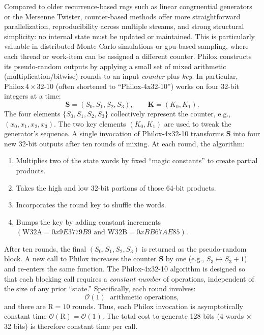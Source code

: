 Compared to older recurrence-based \acrshort{rng}s such as linear congruential generators or the Mersenne Twister, counter-based methods offer more straightforward parallelization, reproducibility across multiple streams, and strong structural simplicity: no internal state must be updated or maintained. This is particularly valuable in distributed Monte Carlo simulations or \acrshort{gpu}-based sampling, where each thread or work-item can be assigned a different counter. Philox constructs its pseudo-random outputs by applying a small set of mixed arithmetic (multiplication/bitwise) rounds to an input \emph{counter} plus \emph{key}. In particular, \(\mathrm{Philox}\,4\times32\text{-10}\) (often shortened to “Philox-4x32-10”) works on four 32-bit integers at a time:
\[
  \mathbf{S} = (S_0, S_1, S_2, S_3),
  \qquad
  \mathbf{K} = (K_0, K_1).
\]
The four elements \(\{S_0, S_1, S_2, S_3\}\) collectively represent the counter, e.g., \((x_0, x_1, x_2, x_3)\). The two key elements \((K_0, K_1)\) are used to tweak the generator's sequence. A single invocation of Philox-4x32-10 transforms \(\mathbf{S}\) into four new 32-bit outputs after ten rounds of mixing. At each round, the algorithm:
\begin{enumerate}
    \item Multiplies two of the state words by fixed “magic constants” to create partial products.
    \item Takes the high and low 32-bit portions of those 64-bit products.
    \item Incorporates the round key to shuffle the words.
    \item Bumps the key by adding constant increments \((\mathrm{W32A} = 0x9E3779B9 \text{ and } \mathrm{W32B} = 0xBB67AE85)\).
\end{enumerate}
After ten rounds, the final \((S_0, S_1, S_2, S_3)\) is returned as the pseudo-random block. A new call to Philox increases the counter \(\mathbf{S}\) by one (e.g., \(S_3 \mapsto S_3 + 1\)) and re-enters the same function. The Philox-4x32-10 algorithm is designed so that each blocking call requires a \emph{constant number} of operations, independent of the size of any prior “state.” Specifically, each round involves:
\[
  \mathcal{O}(1)\;\text{ arithmetic operations},
\]
and there are \(\mathrm{R} = 10\) rounds. Thus, each Philox invocation is asymptotically constant time \(\mathcal{O}(\mathrm{R}) = \mathcal{O}(1)\). The total cost to generate 128 bits (4 words \(\times\) 32 bits) is therefore constant time per call.


